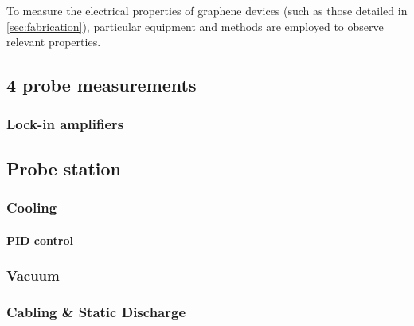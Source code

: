 \documentclass[../../Matt_Gebert_Honours_Thesis.tex]{subfiles}
\begin{document}
	
	To measure the electrical properties of graphene devices (such as those detailed in \cref{sec:fabrication}), particular equipment and methods are employed to observe relevant properties. 
	
	\subsection{4 probe measurements}
	
	\subsubsection{Lock-in amplifiers}
	
	\subsection{Probe station}
	\subsubsection{Cooling}
	\paragraph{PID control}
	\subsubsection{Vacuum}
	\subsubsection{Cabling \& Static Discharge}
	
\end{document}
